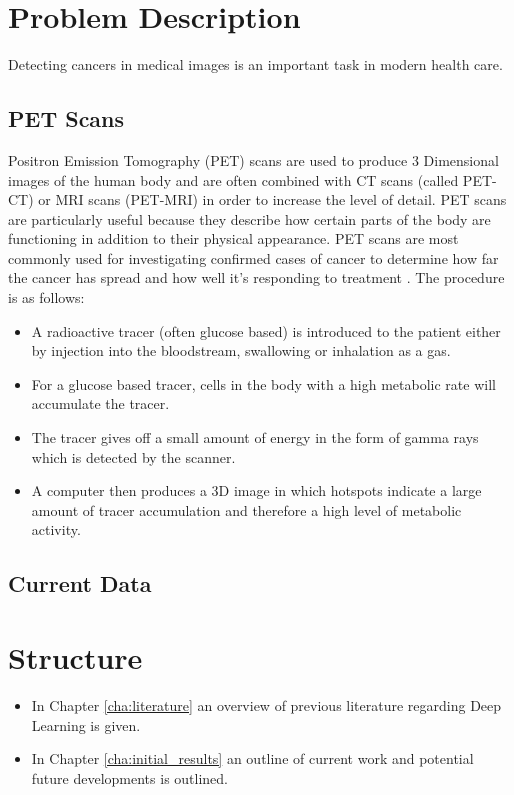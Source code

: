 \section{Problem Description}\label{sec:problem_description_int}
Detecting cancers in medical images is an important task in modern health care.

\subsection{PET Scans}\label{subsec:pet_scan_int}
Positron Emission Tomography (PET) scans are used to produce 3 Dimensional images of the human body and are often combined with CT scans (called PET-CT) or MRI scans (PET-MRI) in order to increase the level of detail.
PET scans are particularly useful because they describe how certain parts of the body are functioning in addition to their physical appearance.
PET scans are most commonly used for investigating confirmed cases of cancer to determine how far the cancer has spread and how well it's responding to treatment \cite{Radiology_ACR, PET_scan}.
The procedure is as follows:

\begin{itemize}
    \item A radioactive tracer (often glucose based) is introduced to the patient either by injection into the bloodstream, swallowing or inhalation as a gas.
    \item For a glucose based tracer, cells in the body with a high metabolic rate will accumulate the tracer.
    \item The tracer gives off a small amount of energy in the form of gamma rays which is detected by the scanner.
    \item A computer then produces a 3D image in which hotspots indicate a large amount of tracer accumulation and therefore a high level of metabolic activity.
\end{itemize}


\subsection{Current Data}\label{subsec:current_data_intro}



\section{Structure}\label{sec:structure}

\begin{itemize}
    \item In Chapter \ref{cha:literature} an overview of previous literature regarding Deep Learning is given.
    \item In Chapter \ref{cha:initial_results} an outline of current work and potential future developments is outlined.
\end{itemize}